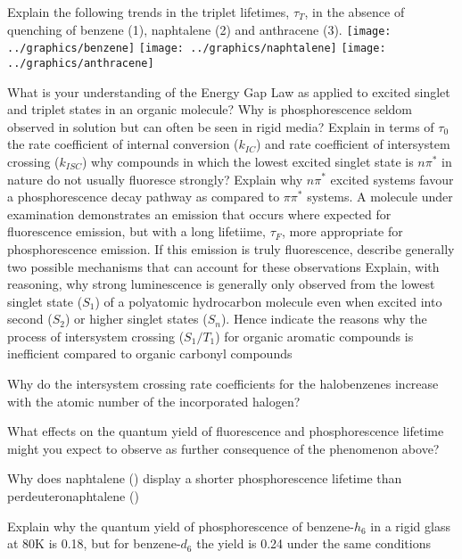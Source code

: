 \documentclass[a4paper,12pt,titlepage]{article}
\begin{document}
\begin{ExerciseList}
\Exercise 
\Question Explain the following trends in the triplet lifetimes, \(\tau_T\), in the absence of quenching of benzene (1), naphtalene (2) and anthracene (3).\newline
\texttt{[image: ../graphics/benzene]} \hspace{1cm} \texttt{[image: ../graphics/naphtalene]} \hspace{1cm} \texttt{[image: ../graphics/anthracene]}\newline

\Question What is your understanding of the Energy Gap Law as applied to excited singlet and triplet states in an organic molecule?
\Question Why is phosphorescence seldom observed in solution but can often be seen in rigid media?
\Question Explain in terms of \(\tau_0\) the rate coefficient of internal conversion (\(k_{IC}\)) and rate coefficient of intersystem crossing (\(k_{ISC}\)) why compounds in which the lowest excited singlet state is \(n\pi^*\) in nature do not usually fluoresce strongly?
\Question Explain why \(n\pi^*\) excited systems favour a phosphorescence decay pathway as compared to \(\pi\pi^*\) systems.
\Question A molecule under examination demonstrates an emission that occurs where expected for fluorescence emission, but with a long lifetiime, \(\tau_F\), more appropriate for phosphorescence emission. If this emission is truly fluorescence, describe generally two possible mechanisms that can account for these observations
\Question Explain, with reasoning, why strong luminescence is generally only observed from the lowest singlet state (\(S_1\)) of a polyatomic hydrocarbon molecule even when excited into second (\(S_2\)) or higher singlet states (\(S_n\)). Hence indicate the reasons why the process of intersystem crossing (\(S_1/T_1\)) for organic aromatic compounds is inefficient compared to organic carbonyl compounds

\Exercise Why do the intersystem crossing rate coefficients for the halobenzenes increase with the atomic number of the incorporated halogen?

\Exercise What effects on the quantum yield of fluorescence and phosphorescence lifetime might you expect to observe as further consequence of the phenomenon above?

\Exercise Why does naphtalene () display a shorter phosphorescence lifetime than perdeuteronaphtalene ()

\Exercise Explain why the quantum yield of phosphorescence of benzene-\(h_6\) in a rigid glass at 80K is 0.18, but for benzene-\(d_6\) the yield is 0.24 under the same conditions


\end{ExerciseList}
\end{document}
